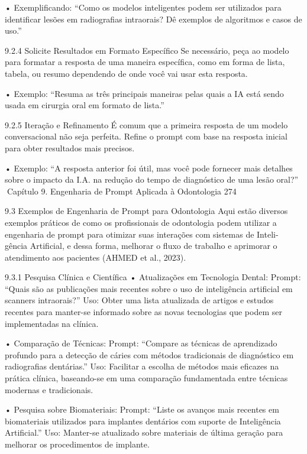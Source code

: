     • Exemplificando: “Como os modelos inteligentes podem ser utilizados para
      identificar lesões em radiografias intraorais? Dê exemplos de algoritmos e casos
      de uso.”

9.2.4    Solicite Resultados em Formato Específico
Se necessário, peça ao modelo para formatar a resposta de uma maneira específica,
como em forma de lista, tabela, ou resumo dependendo de onde você vai usar esta
resposta.

    • Exemplo: “Resuma as três principais maneiras pelas quais a IA está sendo
      usada em cirurgia oral em formato de lista.”

9.2.5    Iteração e Refinamento
É comum que a primeira resposta de um modelo conversacional não seja perfeita.
Refine o prompt com base na resposta inicial para obter resultados mais precisos.

    • Exemplo: “A resposta anterior foi útil, mas você pode fornecer mais detalhes
      sobre o impacto da I.A. na redução do tempo de diagnóstico de uma lesão oral?”
Capítulo 9. Engenharia de Prompt Aplicada à Odontologia                             274


9.3     Exemplos de Engenharia de Prompt para Odontologia
Aqui estão diversos exemplos práticos de como os profissionais de odontologia podem
utilizar a engenharia de prompt para otimizar suas interações com sistemas de Inteli-
gência Artificial, e dessa forma, melhorar o fluxo de trabalho e aprimorar o atendimento
aos pacientes (AHMED et al., 2023).

9.3.1    Pesquisa Clínica e Científica
    • Atualizações em Tecnologia Dental:
      Prompt: “Quais são as publicações mais recentes sobre o uso de inteligência
      artificial em scanners intraorais?”
      Uso: Obter uma lista atualizada de artigos e estudos recentes para manter-se
      informado sobre as novas tecnologias que podem ser implementadas na clínica.

    • Comparação de Técnicas:
      Prompt: “Compare as técnicas de aprendizado profundo para a detecção de
      cáries com métodos tradicionais de diagnóstico em radiografias dentárias.”
      Uso: Facilitar a escolha de métodos mais eficazes na prática clínica, baseando-se
      em uma comparação fundamentada entre técnicas modernas e tradicionais.

    • Pesquisa sobre Biomateriais:
      Prompt: “Liste os avanços mais recentes em biomateriais utilizados para implantes
      dentários com suporte de Inteligência Artificial.”
      Uso: Manter-se atualizado sobre materiais de última geração para melhorar os
      procedimentos de implante.

